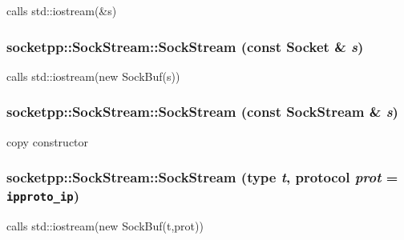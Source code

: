 calls std::iostream(\&s) 

\hypertarget{classsocketpp_1_1SockStream_704f4e77af424bd0638e736653e2d1b3}{
\subsubsection[{SockStream}]{\setlength{\rightskip}{0pt plus 5cm}socketpp::SockStream::SockStream (const {\bf Socket} \& {\em s})}}
\label{classsocketpp_1_1SockStream_704f4e77af424bd0638e736653e2d1b3}


calls std::iostream(new SockBuf(s)) 

\hypertarget{classsocketpp_1_1SockStream_0310cdd1f212beec6b686d0a549f1788}{
\subsubsection[{SockStream}]{\setlength{\rightskip}{0pt plus 5cm}socketpp::SockStream::SockStream (const {\bf SockStream} \& {\em s})}}
\label{classsocketpp_1_1SockStream_0310cdd1f212beec6b686d0a549f1788}


copy constructor 

\hypertarget{classsocketpp_1_1SockStream_4baa8d20dd73480832c7dd9cbad15f75}{
\subsubsection[{SockStream}]{\setlength{\rightskip}{0pt plus 5cm}socketpp::SockStream::SockStream ({\bf type} {\em t}, \/  {\bf protocol} {\em prot} = {\tt ipproto\_\-ip})}}
\label{classsocketpp_1_1SockStream_4baa8d20dd73480832c7dd9cbad15f75}


calls std::iostream(new SockBuf(t,prot)) 



